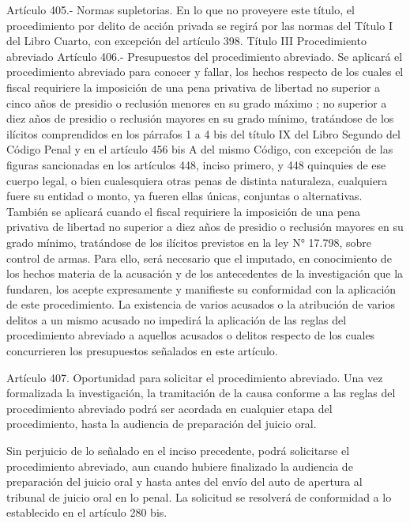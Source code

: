     Artículo 405.- Normas supletorias. En lo que no proveyere este título, el procedimiento por delito de acción privada se regirá por las normas del Título I del Libro Cuarto, con excepción del artículo 398.
    Título III
    Procedimiento abreviado
    Artículo 406.- Presupuestos del procedimiento abreviado. Se aplicará el procedimiento abreviado para conocer y fallar, los hechos respecto de los cuales el fiscal requiriere la imposición de una pena privativa de libertad no superior a cinco años de presidio o reclusión menores en su grado máximo ; no superior a diez años de presidio o reclusión mayores en su grado mínimo, tratándose de los ilícitos comprendidos en los párrafos 1 a 4 bis del título IX del Libro Segundo del Código Penal y en el artículo 456 bis A del mismo Código, con excepción de las figuras sancionadas en los artículos 448, inciso primero, y 448 quinquies de ese cuerpo legal, o bien cualesquiera otras penas de distinta naturaleza, cualquiera fuere su entidad o monto, ya fueren ellas únicas, conjuntas o alternativas.
    También se aplicará cuando el fiscal requiriere la imposición de una pena privativa de libertad no superior a diez años de presidio o reclusión mayores en su grado mínimo, tratándose de los ilícitos previstos en la ley N° 17.798, sobre control de armas.
    Para ello, será necesario que el imputado, en conocimiento de los hechos materia de la acusación y de los antecedentes de la investigación que la fundaren, los acepte expresamente y manifieste su conformidad con la aplicación de este procedimiento.
    La existencia de varios acusados o la atribución de varios delitos a un mismo acusado no impedirá la aplicación de las reglas del procedimiento abreviado a aquellos acusados o delitos respecto de los cuales concurrieren los presupuestos señalados en este artículo.




    Artículo 407. Oportunidad para solicitar el procedimiento abreviado. Una vez formalizada la investigación, la tramitación de la causa conforme a las reglas del procedimiento abreviado podrá ser acordada en cualquier etapa del procedimiento, hasta la audiencia de preparación del juicio oral.

    Sin perjuicio de lo señalado en el inciso precedente, podrá solicitarse el procedimiento abreviado, aun cuando hubiere finalizado la audiencia de preparación del juicio oral y hasta antes del envío del auto de apertura al tribunal de juicio oral en lo penal. La solicitud se resolverá de conformidad a lo establecido en el artículo 280 bis.

